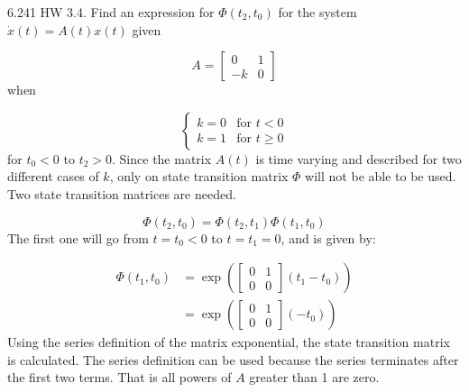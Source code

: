 \begin{example}
  6.241 HW 3.4.
  Find an expression for $\Phi(t_{2},t_{0})$ for the system $\dot{x}(t)=A(t)x(t)$ given

  \begin{equation*}
    A=
    \begin{bmatrix}
      0 & 1 \\ -k & 0
    \end{bmatrix}
  \end{equation*}
  when

  \begin{equation*}
    \begin{cases}
      k=0 & \text{for } t<0\\
      k=1 & \text{for } t\geq0
    \end{cases}
  \end{equation*}
   for $t_{0}<0$ to $t_{2}>0$.
  Since the matrix $A(t)$ is time varying and described for two different cases of $k$, only on state transition matrix $\Phi$ will not be able to be used.
  Two state transition matrices are needed.

  \begin{equation*}
    \Phi(t_{2},t_{0})=\Phi(t_{2},t_{1})\Phi(t_{1},t_{0})
  \end{equation*}
  The first one will go from $t=t_{0}<0$ to $t=t_{1}=0$, and is given by:

  \begin{equation*}
    \begin{split}
      \Phi(t_{1},t_{0})
      &=\exp\left(
        \begin{bmatrix}
          0 & 1 \\ 0 & 0
        \end{bmatrix}(t_{1}-t_{0})
        \right) \\
        &=\exp\left(
        \begin{bmatrix}
          0 & 1 \\ 0 & 0
        \end{bmatrix}(-t_{0})
      \right)
    \end{split}
  \end{equation*}
  Using the series definition of the matrix exponential, the state transition matrix is calculated.
  The series definition can be used because the series terminates after the first two terms.
  That is all powers of $A$ greater than 1 are zero.


\end{example}
